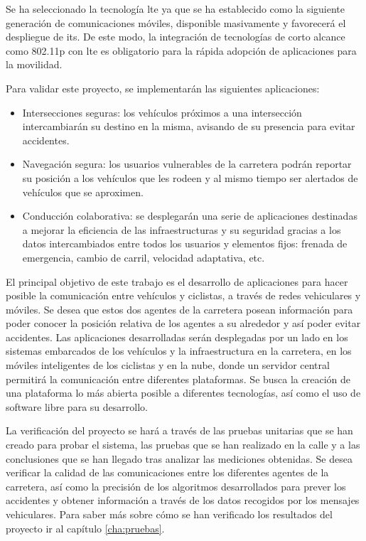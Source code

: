 Se ha seleccionado la tecnología \gls{lte} ya que se ha establecido como la siguiente generación de comunicaciones móviles, disponible masivamente y favorecerá el despliegue de \gls{its}. De este modo, la integración de tecnologías de corto alcance como \Gls{802.11p} con \gls{lte} es obligatorio para la rápida adopción de aplicaciones para la movilidad.

Para validar este proyecto, se implementarán las siguientes aplicaciones:
\begin{itemize}
	\item Intersecciones seguras: los vehículos próximos a una intersección intercambiarán su destino en la misma, avisando de su presencia para evitar accidentes.

	\item Navegación segura: los usuarios vulnerables de la carretera podrán reportar su posición a los vehículos que les rodeen y al mismo tiempo ser alertados de vehículos que se aproximen.

	\item Conducción colaborativa: se desplegarán una serie de aplicaciones destinadas a mejorar la eficiencia de las infraestructuras y su seguridad gracias a los datos intercambiados entre todos los usuarios y elementos fijos: frenada de emergencia, cambio de carril, velocidad adaptativa, etc.
\end{itemize}

El principal objetivo de este trabajo es el desarrollo de aplicaciones para hacer posible la comunicación entre vehículos y ciclistas, a través de redes vehiculares y móviles. Se desea que estos dos agentes de la carretera posean información para poder conocer la posición relativa de los agentes a su alrededor y así poder evitar accidentes. Las aplicaciones desarrolladas serán desplegadas por un lado en los sistemas embarcados de los vehículos y la infraestructura en la carretera, en los móviles inteligentes de los ciclistas y en la nube, donde un servidor central permitirá la comunicación entre diferentes plataformas. Se busca la creación de una plataforma lo más abierta posible a diferentes tecnologías, así como el uso de software libre para su desarrollo.

La verificación del proyecto se hará a través de las pruebas unitarias que se han creado para probar el sistema, las pruebas que se han realizado en la calle y a las conclusiones que se han llegado tras analizar las mediciones obtenidas. Se desea verificar la calidad de las comunicaciones entre los diferentes agentes de la carretera, así como la precisión de los algoritmos desarrollados para prever los accidentes y obtener información a través de los datos recogidos por los mensajes vehiculares. Para saber más sobre cómo se han verificado los resultados del proyecto ir al capítulo \ref{cha:pruebas}.

